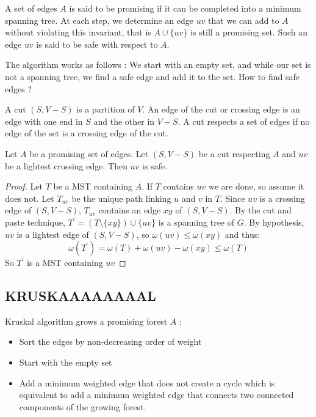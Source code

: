 \documentclass{cours}
\begin{document}
        \begin{definition}
            A set of edges $A$ is said to be promising if it can be completed into a minimum spanning tree. At each step, we determine an edge $uv$ that we can add to $A$ without violating this invariant, that is $A \cup \{uv\}$ is still a promising set.
            Such an edge $uv$ is said to be safe with respect to $A$.
        \end{definition}

        The algorithm works as follows : We start with an empty set, and while our set is not a spanning tree, we find a safe edge and add it to the set.
        How to find safe edges ? 

        \begin{definition}
            A cut $\left(S, V - S\right)$ is a partition of $V$. An edge of the cut or crossing edge is an edge with one end in $S$ and the other in $V - S$. A cut respects a set of edges if no edge of the set is a crossing edge of the cut.
        \end{definition}

        \begin{proposition}
            Let $A$ be a promising set of edges. Let $\left(S, V - S\right)$ be a cut respecting $A$ and $uv$ be a lightest crossing edge. Then $uv$ is safe.
        \end{proposition}
        \begin{proof}
            Let $T$ be a MST containing $A$. If $T$ contains $uv$ we are done, so assume it does not. Let $T_{uv}$ be the unique path linking $u$ and $v$ in $T$. Since $uv$ is a crossing edge of $(S, V - S)$, $T_{uv}$ contains an edge $xy$ of $(S, V - S)$. By the cut and paste technique, $T^{'} = (T \setminus \{xy\} ) \cup \{uv\}$ is a spanning tree of $G$. By hypothesis, $uv$ is a lightest edge of $(S, V - S)$, so $\omega(uv) \leq \omega(xy)$ and thus: \[\omega(T^{'}) = \omega(T) + \omega(uv) - \omega(xy) \leq \omega(T)\]
            So $T^{'}$ is a MST containing $uv$ 
        \end{proof}

        \subsection{KRUSKAAAAAAAAL}
        Kruskal algorithm grows a promising forest $A$ : 
        \begin{itemize}
            \item Sort the edges by non-decreasing order of weight
            \item Start with the empty set
            \item Add a minimum weighted edge that does not create a cycle which is equivalent to add a minimum weighted edge that connects two connected components of the growing forest.
        \end{itemize}
\end{document}
